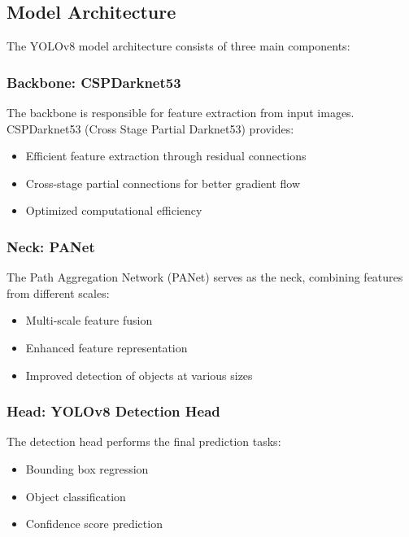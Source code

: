 \documentclass[12pt,a4paper]{article}
\begin{document}
\subsection{Model Architecture}

The YOLOv8 model architecture consists of three main components:

\subsubsection{Backbone: CSPDarknet53}

The backbone is responsible for feature extraction from input images. CSPDarknet53 (Cross Stage Partial Darknet53) provides:

\begin{itemize}
    \item Efficient feature extraction through residual connections
    \item Cross-stage partial connections for better gradient flow
    \item Optimized computational efficiency
\end{itemize}

\subsubsection{Neck: PANet}

The Path Aggregation Network (PANet) serves as the neck, combining features from different scales:

\begin{itemize}
    \item Multi-scale feature fusion
    \item Enhanced feature representation
    \item Improved detection of objects at various sizes
\end{itemize}

\subsubsection{Head: YOLOv8 Detection Head}

The detection head performs the final prediction tasks:

\begin{itemize}
    \item Bounding box regression
    \item Object classification
    \item Confidence score prediction
\end{itemize}
\end{document}
